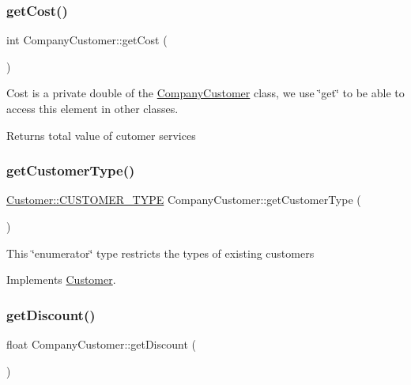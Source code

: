 \subsubsection{\texorpdfstring{get\+Cost()}{getCost()}}
{\footnotesize\ttfamily int Company\+Customer\+::get\+Cost (\begin{DoxyParamCaption}{ }\end{DoxyParamCaption})}

Cost is a private double of the \hyperlink{classCompanyCustomer}{Company\+Customer} class, we use \char`\"{}get\char`\"{} to be able to access this element in other classes. \begin{DoxyReturn}{Returns}
total value of cutomer services 
\end{DoxyReturn}
\hypertarget{classCompanyCustomer_a29b36593a5cc93f3c6d9f9372b261bba}{}\label{classCompanyCustomer_a29b36593a5cc93f3c6d9f9372b261bba} 
\subsubsection{\texorpdfstring{get\+Customer\+Type()}{getCustomerType()}}
{\footnotesize\ttfamily \hyperlink{classCustomer_adf157cb713398bb38163743659ec3049}{Customer\+::\+C\+U\+S\+T\+O\+M\+E\+R\+\_\+\+T\+Y\+PE} Company\+Customer\+::get\+Customer\+Type (\begin{DoxyParamCaption}{ }\end{DoxyParamCaption})\hspace{0.3cm}{\ttfamily [virtual]}}

This \char`\"{}enumerator\char`\"{} type restricts the types of existing customers 

Implements \hyperlink{classCustomer_a0353fcbdcb8ec729d95e9086df828e34}{Customer}.

\hypertarget{classCompanyCustomer_aa9af04558e4c90df0c2379456ae7b626}{}\label{classCompanyCustomer_aa9af04558e4c90df0c2379456ae7b626} 
\subsubsection{\texorpdfstring{get\+Discount()}{getDiscount()}}
{\footnotesize\ttfamily float Company\+Customer\+::get\+Discount (\begin{DoxyParamCaption}{ }\end{DoxyParamCaption})\hspace{0.3cm}{\ttfamily [virtual]}}

